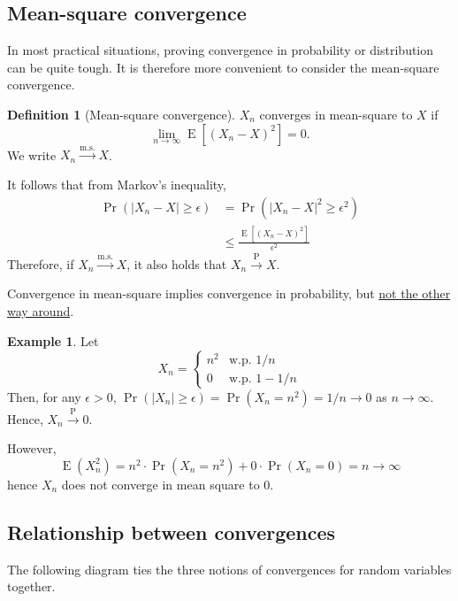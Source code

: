 \documentclass[
]{book}
\DeclareMathOperator{\E}{E}
\theoremstyle{definition}
\newtheorem{definition}{Definition}[chapter]
\theoremstyle{definition}
\newtheorem{example}{Example}[chapter]
\theoremstyle{definition}
\theoremstyle{definition}
\theoremstyle{remark}
\begin{document}
\hypertarget{mean-square-convergence}{%
\subsection{Mean-square convergence}\label{mean-square-convergence}}

In most practical situations, proving convergence in probability or distribution can be quite tough.
It is therefore more convenient to consider the mean-square convergence.

\begin{definition}[Mean-square convergence]
\(X_n\) converges in mean-square to \(X\) if
\[\lim_{n\to\infty} \E\left[(X_n - X)^2 \right] = 0.\]
We write \(X_n\xrightarrow{\text{m.s.}}X\).
\end{definition}

It follows that from Markov's inequality,
\[\begin{aligned}
\Pr(|X_n-X|\geq \epsilon)
&= \Pr(|X_n-X|^2\geq \epsilon^2) \\
    &\leq \frac{\E\left[(X_n - X)^2 \right]}{\epsilon^2}
\end{aligned}\]
Therefore, if \(X_n\xrightarrow{\text{m.s.}}X\), it also
holds that \(X_n\xrightarrow{\text{P}}X\).

Convergence in mean-square implies convergence in probability, but \uline{not the other way around}.

\begin{example}
Let
\[ X_n = 
    \begin{cases}
      n^2 &\text{w.p. } 1/n \\
      0 &\text{w.p. } 1- 1/n  
    \end{cases}\]
Then, for any \(\epsilon>0\),
\(\Pr(|X_n|\geq\epsilon) = \Pr(X_n = n^2) = 1/n \to 0\) as \(n\to\infty\).
Hence, \(X_n{\xrightarrow{\text{P}}}0\).

However, \[\E(X_n^2) = n^2 \cdot \Pr(X_n = n^2) + 0  \cdot \Pr(X_n = 0) = n \to \infty\] hence \(X_n\) does not converge in mean square to 0.
\end{example}

\hypertarget{relationship-between-convergences}{%
\subsection{Relationship between convergences}\label{relationship-between-convergences}}

The following diagram ties the three notions of convergences for random variables together.
\end{document}
